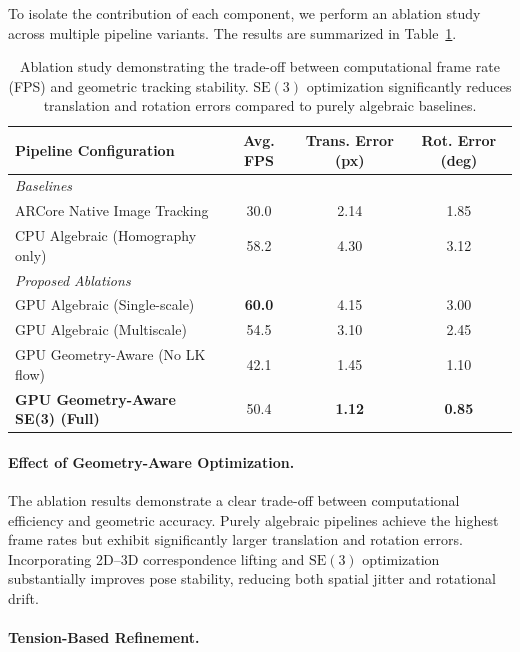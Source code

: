 To isolate the contribution of each component, we perform an ablation study across multiple pipeline variants. The results are summarized in Table~\ref{tab:ablation}.

\begin{table}[htbp]
\centering
\caption{Ablation study demonstrating the trade-off between computational frame rate (FPS) and geometric tracking stability. $\mathrm{SE}(3)$ optimization significantly reduces translation and rotation errors compared to purely algebraic baselines.}
\label{tab:ablation}
\begin{tabular}{@{}lccc@{}}
\toprule
\textbf{Pipeline Configuration} & \textbf{Avg. FPS} & \textbf{Trans. Error (px)} & \textbf{Rot. Error (deg)} \\
\midrule
\textit{Baselines} & & & \\
ARCore Native Image Tracking & 30.0 & 2.14 & 1.85 \\
CPU Algebraic (Homography only) & 58.2 & 4.30 & 3.12 \\
\midrule
\textit{Proposed Ablations} & & & \\
GPU Algebraic (Single-scale) & \textbf{60.0} & 4.15 & 3.00 \\
GPU Algebraic (Multiscale) & 54.5 & 3.10 & 2.45 \\
GPU Geometry-Aware (No LK flow) & 42.1 & 1.45 & 1.10 \\
\textbf{GPU Geometry-Aware SE(3) (Full)} & 50.4 & \textbf{1.12} & \textbf{0.85} \\
\bottomrule
\end{tabular}
\end{table}

\paragraph{Effect of Geometry-Aware Optimization.}

The ablation results demonstrate a clear trade-off between computational efficiency and geometric accuracy. Purely algebraic pipelines achieve the highest frame rates but exhibit significantly larger translation and rotation errors. Incorporating 2D--3D correspondence lifting and $\mathrm{SE}(3)$ optimization substantially improves pose stability, reducing both spatial jitter and rotational drift.

\paragraph{Tension-Based Refinement.}

